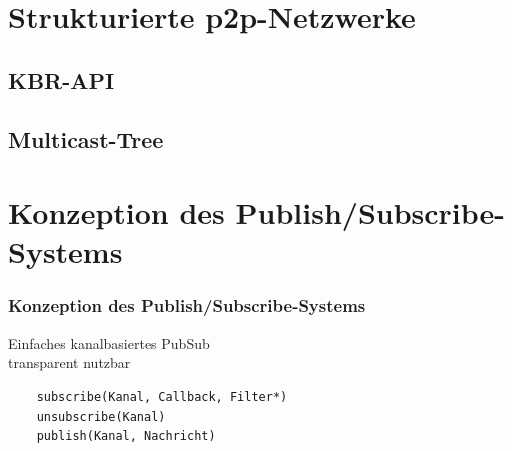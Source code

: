 \documentclass[professionalfonts]{beamer}
\begin{document}
\section{Strukturierte p2p-Netzwerke}
\subsection*{KBR-API}

\subsection*{Multicast-Tree}

\section{Konzeption des Publish/Subscribe-Systems}
\begin{frame}[fragile]
	\frametitle{Konzeption des Publish/Subscribe-Systems}
	Einfaches kanalbasiertes PubSub\\	transparent nutzbar \\

	\begin{verbatim}
	subscribe(Kanal, Callback, Filter*)
	unsubscribe(Kanal)
	publish(Kanal, Nachricht)
	\end{verbatim}

\end{frame}
\end{document}
